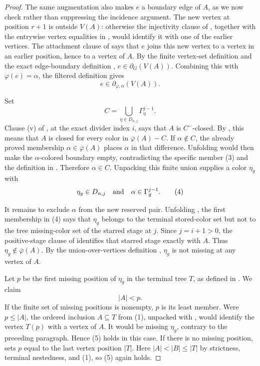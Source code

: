 \begin{proof}
The same augmentation also makes $e$ a boundary edge of $A$, as we now
check rather than suppressing the incidence argument.  The new vertex at
position $r+1$ is outside $V(A)$: otherwise the injectivity clause of
, together with the entrywise vertex equalities in
, would identify it with one of the
earlier vertices.  The attachment clause of  says
that $e$ joins this new vertex to a vertex in an earlier position, hence
to a vertex of $A$.  By the finite vertex-set definition
 and the exact edge-boundary definition
, $e\in\partial_G(V(A))$.  Combining this with
$\varphi(e)=\alpha$, the filtered definition
 gives
\[
 e\in\partial_{\varphi,\alpha}(V(A)).
\tag{3}
\]

Set
\[
 C=\bigcup_{\eta\in D_{n,j}}\Gamma^{j-1}_{\eta}.
\]
Clause (v) of , at the exact divider index $i$,
says that $A$ is $C^{-}$-closed.  By
, this means that $A$ is closed for
every color in $\overline\varphi(A)-C$.  If $\alpha\notin C$, the
already proved membership $\alpha\in\overline\varphi(A)$ places
$\alpha$ in that difference.  Unfolding 
would then make the $\alpha$-colored boundary empty, contradicting the
specific member (3) and the definition in
.  Therefore $\alpha\in C$.  Unpacking this
finite union supplies a color $\eta_g$ with
\[
 \eta_g\in D_{n,j}
 \quad\hbox{and}\quad
 \alpha\in\Gamma^{j-1}_{g}.
\tag{4}
\]

It remains to exclude $\alpha$ from the new reserved pair.  Unfolding
, the first membership in (4) says that
$\eta_g$ belongs to the terminal stored-color set but not to the tree
missing-color set of the starred stage at $j$.  Since $j=i+1>0$, the
positive-stage clause of  identifies that
starred stage exactly with $A$.  Thus
$\eta_g\notin\overline\varphi(A)$.  By the union-over-vertices definition
, $\eta_g$ is not missing at any vertex of
$A$.

Let $p$ be the first missing position of $\eta_g$ in the terminal tree
$T$, as defined in .  We claim
\[
                             |A|<p.
\tag{5}
\]
If the finite set of missing positions is nonempty, $p$ is its least
member.  Were $p\leq |A|$, the ordered inclusion $A\subseteq T$ from
(1), unpacked with , would identify
the vertex $T(p)$ with a vertex of $A$.  It would be missing $\eta_g$,
contrary to the preceding paragraph.  Hence (5) holds in this case.  If
there is no missing position, 
sets $p$ equal to the last vertex position $|T|$.  Here
$|A|<|B|\leq|T|$ by strictness, terminal nestedness, and (1), so (5)
again holds.


\end{proof}
